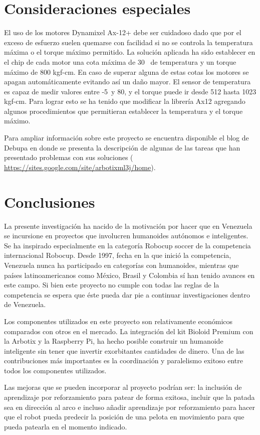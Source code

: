 \documentclass[conference, letterpaper]{IEEEtranMC1}
\begin{document}
\section{Consideraciones especiales}
\label{sec:consideraciones}

El uso de los motores Dynamixel Ax-12+ debe ser cuidadoso dado que por el exceso de esfuerzo suelen quemarse con facilidad si no se controla la temperatura máxima o el torque máximo permitido. La solución aplicada ha sido establecer en el chip de cada motor una cota máxima de 30\celsius~  de temperatura y un torque máximo de 800 kgf-cm. En caso de superar alguna de estas cotas los motores se apagan automáticamente evitando así un daño mayor. El sensor de temperatura es capaz de medir valores entre -5\celsius~y 80\celsius, y el torque puede ir desde 512 hasta 1023 kgf-cm. Para lograr esto se ha tenido que modificar la librería Ax12 agregando algunos procedimientos que permitieran establecer la temperatura y el torque máximo.

Para ampliar información sobre este proyecto se encuentra disponible el blog de Debupa en donde se presenta la descripción de algunas de las tareas que han presentado problemas con sus soluciones (\url{ https://sites.google.com/site/arbotixml3j/home}).


\section{Conclusiones}
\label{sec:Conclusiones}

La presente investigación ha nacido de la motivación por hacer que en Venezuela se incursione en proyectos que involucren humanoides autónomos e inteligentes. Se ha inspirado especialmente en la categoría Robocup soccer de la competencia internacional Robocup. Desde 1997, fecha en la que inició la competencia, Venezuela nunca ha participado en categorías con humanoides, mientras que países latinoamericanos como México, Brasil y Colombia sí han tenido avances en este campo. Si bien este proyecto no cumple con todas las reglas de la competencia se espera que éste pueda dar pie a continuar investigaciones dentro de Venezuela. 

Los componentes utilizados en este proyecto son relativamente económicos comparados con otros en el mercado. La integración del kit Bioloid Premium con la Arbotix y la Raspberry Pi, ha hecho posible construir un humanoide inteligente sin tener que invertir exorbitantes cantidades de dinero. Una de las contribuciones más importantes es la coordinación y paralelismo exitoso entre todos los componentes utilizados.

Las mejoras que se pueden incorporar al proyecto podrían ser: la inclusión de aprendizaje por reforzamiento para patear de forma exitosa, incluir que la patada sea en dirección al arco e incluso añadir aprendizaje por reforzamiento para hacer que el robot pueda predecir la posición de una pelota en movimiento para que pueda patearla en el momento indicado.  






\end{document}
